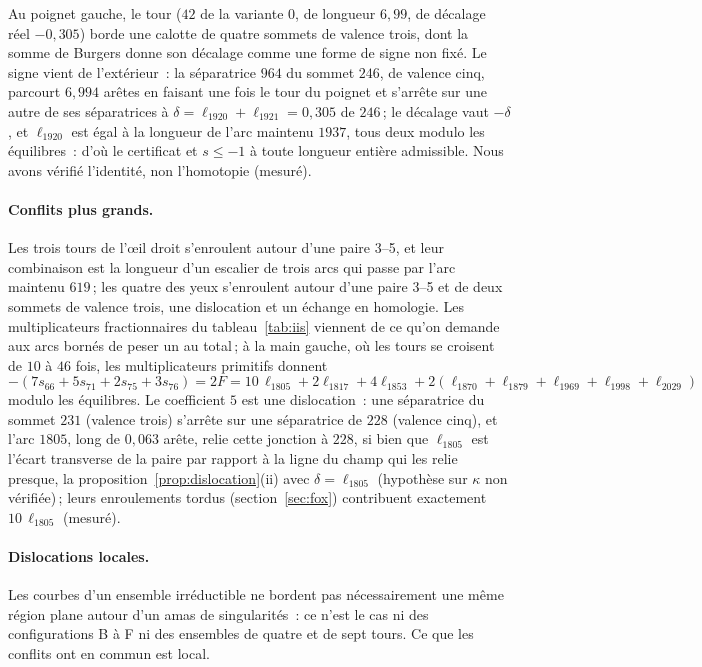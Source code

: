 \documentclass[11pt,a4paper]{article}
\newcommand{\shift}{s}
\begin{document}
Au poignet gauche, le tour ($42$ de la variante 0, de longueur $6,99$, de
décalage réel $-0,305$) borde une calotte de quatre sommets de valence trois,
dont la somme de Burgers donne son décalage comme une forme de signe non
fixé. Le signe vient de l'extérieur~: la séparatrice $964$ du sommet $246$,
de valence cinq, parcourt $6,994$ arêtes en faisant une fois le tour du
poignet et s'arrête sur une autre de ses séparatrices à $\delta = \ell_{1920}
+ \ell_{1921} = 0,305$ de $246$\,; le décalage vaut $-\delta$, et
$\ell_{1920}$ est égal à la longueur de l'arc maintenu $1937$, tous deux
modulo les équilibres~: d'où le certificat et $\shift \le -1$ à toute
longueur entière admissible. Nous avons vérifié l'identité, non l'homotopie
(mesuré).

\paragraph{Conflits plus grands.}
Les trois tours de l'œil droit s'enroulent autour d'une paire 3--5, et leur
combinaison est la longueur d'un escalier de trois arcs qui passe par l'arc
maintenu $619$\,; les quatre des yeux s'enroulent autour d'une paire 3--5 et
de deux sommets de valence trois, une dislocation et un échange en homologie.
Les multiplicateurs fractionnaires du tableau~\ref{tab:iis} viennent de ce
qu'on demande aux arcs bornés de peser un au total\,; à la main gauche, où les
tours se croisent de $10$ à $46$ fois, les multiplicateurs primitifs donnent
\[
  -(7\shift_{66} + 5\shift_{71} + 2\shift_{75} + 3\shift_{76}) = 2F =
  10\,\ell_{1805} + 2\ell_{1817} + 4\ell_{1853} + 2(\ell_{1870} + \ell_{1879}
  + \ell_{1969} + \ell_{1998} + \ell_{2029})
\]
modulo les équilibres. Le coefficient $5$ est une dislocation~: une
séparatrice du sommet $231$ (valence trois) s'arrête sur une séparatrice de
$228$ (valence cinq), et l'arc $1805$, long de $0,063$ arête, relie cette
jonction à $228$, si bien que $\ell_{1805}$ est l'écart transverse de la paire
par rapport à la ligne du champ qui les relie presque, la
proposition~\ref{prop:dislocation}(ii) avec $\delta = \ell_{1805}$ (hypothèse
sur $\kappa$ non vérifiée)\,; leurs enroulements tordus
(section~\ref{sec:fox}) contribuent exactement $10\,\ell_{1805}$ (mesuré).

\paragraph{Dislocations locales.}
Les courbes d'un ensemble irréductible ne bordent pas nécessairement une même
région plane autour d'un amas de singularités~: ce n'est le cas ni des
configurations B à F ni des ensembles de quatre et de sept tours. Ce que les
conflits ont en commun est local.
\end{document}
